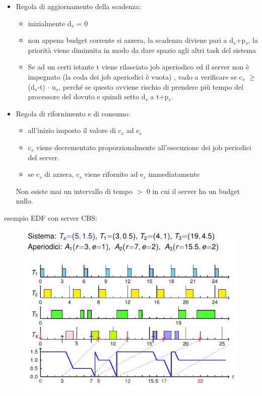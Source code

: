 \documentclass[12pt, oneside]{extbook}
\begin{document}
\begin{itemize}
\item Regola di aggiornamento della scadenza:
\begin{itemize}
\item inizialmente d$_{s}$ = 0
\item non appena budget corrente si azzera, la scadenza diviene pari a d$_{s}$+p$_{s}$, la priorità viene diminuita in modo da dare spazio agli altri task del sistema
\item Se ad un certi istante t viene rilasciato job aperiodico ed il server non è impegnato (la coda dei job aperiodici è vuota) , vado a verificare se c$_{s}$ $\geq$ (d$_{s}$-t) $\cdot$ u$_{s}$, perché se questo avviene rischio di prendere più tempo del processore del dovuto e quindi setto d$_{s}$ a t+p$_{s}$.
\end{itemize}
\item Regola di rifornimento e di consumo:
\begin{itemize}
\item all'inizio imposto il valore di c$_{s}$ ad e$_{s}$
\item c$_{s}$ viene decrementato proporzionalmente all'esecuzione dei job periodici del server.
\item se c$_{s}$ di azzera, c$_{s}$ viene rifornito ad e$_{s}$ immediatamente
\end{itemize}
Non esiste mai un intervallo di tempo $>$ 0 in cui il server ha un budget nullo.
\end{itemize}
esempio EDF con server CBS:
\begin{figure}[!h]
\centering
\includegraphics[scale=0.4]{immagini/image-018.jpg}
\end{figure}
\end{document}
